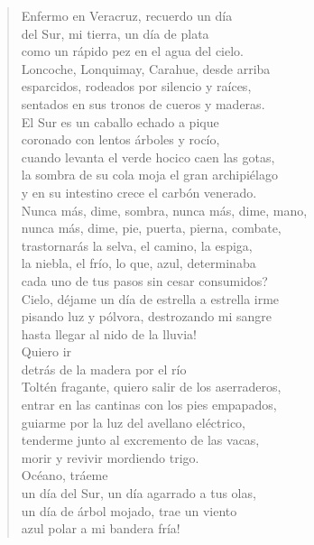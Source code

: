 \documentclass[12pt]{article}
\begin{document}
\clearpage
{}
\begin{verse}

Enfermo en Veracruz, recuerdo un día\\
del Sur, mi tierra, un día de plata\\
como un rápido pez en el agua del cielo.\\
Loncoche, Lonquimay, Carahue, desde arriba\\
esparcidos, rodeados por silencio y raíces,\\
sentados en sus tronos de cueros y maderas.\\
El Sur es un caballo echado a pique\\
coronado con lentos árboles y rocío,\\
cuando levanta el verde hocico caen las gotas,\\
la sombra de su cola moja el gran archipiélago\\
y en su intestino crece el carbón venerado.\\
Nunca más, dime, sombra, nunca más, dime, mano,\\
nunca más, dime, pie, puerta, pierna, combate,\\
trastornarás la selva, el camino, la espiga,\\
la niebla, el frío, lo que, azul, determinaba\\
cada uno de tus pasos sin cesar consumidos?\\
Cielo, déjame un día de estrella a estrella irme\\
pisando luz y pólvora, destrozando mi sangre\\
hasta llegar al nido de la lluvia!\\
Quiero ir\\
detrás de la madera por el río\\
Toltén fragante, quiero salir de los aserraderos,\\
entrar en las cantinas con los pies empapados,\\
guiarme por la luz del avellano eléctrico,\\
tenderme junto al excremento de las vacas,\\
morir y revivir mordiendo trigo.\\
Océano, tráeme\\
un día del Sur, un día agarrado a tus olas,\\
un día de árbol mojado, trae un viento\\
azul polar a mi bandera fría!  

\end{verse}
\end{document}

